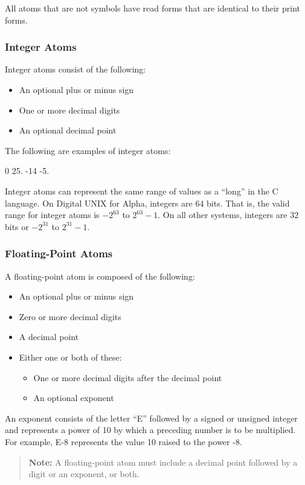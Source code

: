 All atoms that are not symbols have read forms that are identical to
their print forms.

\subsubsection{Integer Atoms}

Integer atoms consist of the following:
\begin{itemize}
\item An optional plus or minus sign
\item One or more decimal digits
\item An optional decimal point
\end{itemize}

The following are examples of integer atoms:
\begin{qv}
0
25.
-14
-5.
\end{qv}
Integer atoms can represent the same range of values as a ``long'' in
the C language. On Digital UNIX for Alpha, integers are 64 bits. That
is, the valid range for integer atoms is $-2^{63}$ to $2^{63}- 1$. On
all other systems, integers are 32 bits or $-2^{31}$ to $2^{31}-1$.

\subsubsection{Floating-Point Atoms}

A floating-point atom is composed of the following:
\begin{itemize}
\item An optional plus or minus sign
\item Zero or more decimal digits
\item A decimal point
\item Either one or both of these:
  \begin{itemize}
  \item One or more decimal digits after the decimal point
  \item An optional exponent
  \end{itemize}
\end{itemize}
An exponent consists of the letter ``E'' followed by a signed
or unsigned integer and represents a power of 10 by which a
preceding number is to be multiplied. For example, E-8
represents the value 10 raised to the power -8.

\begin{quote}
  \textbf{Note:} A floating-point atom must include a decimal point
  followed by a digit or an exponent, or both.
\end{quote}

